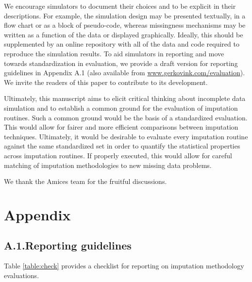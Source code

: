 \documentclass[bimj,fleqn]{w-art}
\begin{document}
We encourage simulators to document their choices and to be explicit in their descriptions. For example, the simulation design may be presented textually, in a flow chart or as a block of pseudo-code, whereas missingness mechanisms may be written as a function of the data or displayed graphically. Ideally, this should be supplemented by an online repository with all of the data and code required to reproduce the simulation results. To aid simulators in reporting and move towards standardization in evaluation, we provide a draft version for reporting guidelines in Appendix A.1 (also available from \underline{www.gerkovink.com/evaluation}). We invite the readers of this paper to contribute to its development. 

Ultimately, this manuscript aims to elicit critical thinking about incomplete data simulation and to establish a common ground for the evaluation of imputation routines. Such a common ground would be the basis of a standardized evaluation. This would allow for fairer and more efficient comparisons between imputation techniques. Ultimately, it would be desirable to evaluate every imputation routine against the same standardized set in order to quantify the statistical properties across imputation routines. If properly executed, this would allow for careful matching of imputation methodologies to new missing data problems. 



\begin{acknowledgement}
We thank the Amices team for the fruitful discussions.
\end{acknowledgement}
\vspace*{1pc}



\section*{Appendix}

\subsection*{A.1.\enspace Reporting guidelines}

Table \ref{table:check} provides a checklist for reporting on imputation methodology evaluations. 
\end{document}

